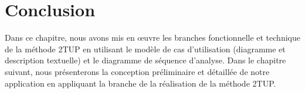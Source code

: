 \section*{Conclusion}
Dans ce chapitre, nous avons mis en œuvre les branches fonctionnelle et technique de la méthode 2TUP en utilisant le modèle de cas d'utilisation (diagramme et description textuelle) et le diagramme de séquence d'analyse. Dans le chapitre suivant, nous présenterons la conception préliminaire et détaillée de notre application en appliquant la branche de la réalisation de la méthode 2TUP.